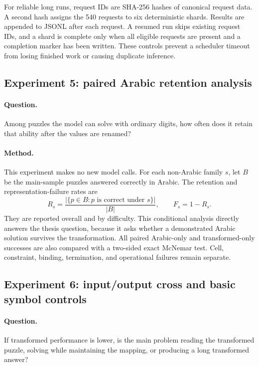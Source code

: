 \documentclass[11pt,a4paper]{article}
\begin{document}
For reliable long runs, request IDs are SHA-256 hashes of canonical request data.  A second hash assigns the 540 requests to six deterministic shards.  Results are appended to JSONL after each request.  A resumed run skips existing request IDs, and a shard is complete only when all eligible requests are present and a completion marker has been written.  These controls prevent a scheduler timeout from losing finished work or causing duplicate inference.

\subsection{Experiment 5: paired Arabic retention analysis}
\paragraph{Question.}
Among puzzles the model can solve with ordinary digits, how often does it retain that ability after the values are renamed?

\paragraph{Method.}
This experiment makes no new model calls.  For each non-Arabic family $s$, let $B$ be the main-sample puzzles answered correctly in Arabic.  The retention and representation-failure rates are
\begin{equation}
R_s=\frac{|\{p\in B:p\text{ is correct under }s\}|}{|B|},
\qquad F_s=1-R_s.
\end{equation}
They are reported overall and by difficulty.  This conditional analysis directly answers the thesis question, because it asks whether a demonstrated Arabic solution survives the transformation.  All paired Arabic-only and transformed-only successes are also compared with a two-sided exact McNemar test.  Cell, constraint, binding, termination, and operational failures remain separate.

\subsection{Experiment 6: input/output cross and basic symbol controls}
\paragraph{Question.}
If transformed performance is lower, is the main problem reading the transformed puzzle, solving while maintaining the mapping, or producing a long transformed answer?
\end{document}
